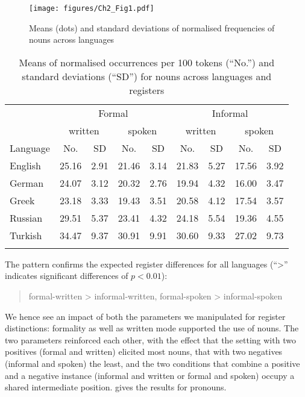 \documentclass[output=paper,colorlinks,citecolor=brown]{langscibook}
\begin{document}
\begin{figure}
\texttt{[image: figures/Ch2\_Fig1.pdf]}
\caption{Means (dots) and standard deviations of normalised frequencies of nouns across languages}
\label{fig:ch2:fig1}
\end{figure}

\begin{table}
\begin{tabular}{l *8{c}}
\lsptoprule
         & \multicolumn{4}{c}{Formal} & \multicolumn{4}{c}{{Informal}}\\\cmidrule(lr){2-5}\cmidrule(lr){6-9}
         & \multicolumn{2}{c}{{{written}}} & \multicolumn{2}{c}{{{spoken}}} & \multicolumn{2}{c}{{{written}}} & \multicolumn{2}{c}{{{spoken}}}\\
         \cmidrule(lr){2-3}\cmidrule(lr){4-5}\cmidrule(lr){6-7}\cmidrule(lr){8-9}
Language & No. & SD & No. & SD & No. & SD & No. & SD  \\\midrule
English & 25.16 & 2.91 & 21.46 & 3.14 & 21.83 & 5.27 & 17.56 & 3.92   \\
German & 24.07 & 3.12 & 20.32 & 2.76 & 19.94 & 4.32 & 16.00 & 3.47 \\
Greek & 23.18 & 3.33 & 19.43 & 3.51 & 20.58 & 4.12 & 17.54 & 3.57 \\
Russian & 29.51 & 5.37 & 23.41 & 4.32 & 24.18 & 5.54 & 19.36 & 4.55\\
Turkish & 34.47 & 9.37 & 30.91 & 9.91 & 30.60 & 9.33 & 27.02 & 9.73 \\
\lspbottomrule
\end{tabular}
\caption{Means of normalised occurrences per 100 tokens (“No.”) and standard deviations (“SD”) for nouns across languages and registers}
\label{tab:ch1:tab1}
\end{table}

The pattern confirms the expected register differences for all languages (“>” indicates significant differences of $p<0.01$):
\begin{quote}
formal-written > informal-written, formal-spoken > informal-spoken
\end{quote}


We hence see an impact of both the parameters we manipulated for register distinctions: formality as well as written mode supported the use of nouns. The two parameters reinforced each other, with the effect that the setting with two positives (formal and written) elicited most nouns, that with two negatives (informal and spoken) the least, and the two conditions that combine a positive and a negative instance (informal and written or formal and spoken) occupy a shared intermediate position.  gives the results for pronouns. 
\end{document}
